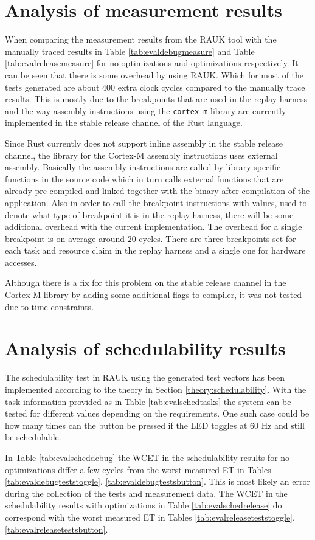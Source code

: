 \section{Analysis of measurement results}
When comparing the measurement results from the RAUK tool with the manually
traced results in Table \ref{tab:evaldebugmeasure} and Table
\ref{tab:evalreleasemeasure} for no optimizations and optimizations
respectively. It can be seen that there is some overhead by using RAUK. Which
for most of the tests generated are about 400 extra clock cycles compared to
the manually trace results. This is mostly due to the breakpoints that are used
in the replay harness and the way assembly instructions using the
\texttt{cortex-m} library are currently implemented in the stable release
channel of the Rust language.

Since Rust currently does not support inline assembly in the stable release
channel, the library for the Cortex-M assembly instructions uses external
assembly. Basically the assembly instructions are called by library specific
functions in the source code which in turn calls external functions that are
already pre-compiled and linked together with the binary after compilation of
the application. Also in order to call the breakpoint instructions with values,
used to denote what type of breakpoint it is in the replay harness, there will
be some additional overhead with the current implementation. The overhead for a
single breakpoint is on average around 20 cycles. There are three breakpoints
set for each task and resource claim in the replay harness and a single one for
hardware accesses.

Although there is a fix for this problem on the stable release channel in the
Cortex-M library by adding some additional flags to compiler, it was not
tested due to time constraints.

\section{Analysis of schedulability results}
The schedulability test in RAUK using the generated test vectors has been
implemented according to the theory in Section \ref{theory:schedulability}.
With the task information provided as in Table \ref{tab:evalschedtasks} the
system can be tested for different values depending on the requirements. One
such case could be how many times can the button be pressed if the LED toggles
at 60 Hz and still be schedulable.

In Table \ref{tab:evalscheddebug} the WCET in the schedulability results for no
optimizations differ a few cycles from the worst measured ET in Tables
\ref{tab:evaldebugteststoggle}, \ref{tab:evaldebugtestsbutton}. This is most
likely an error during the collection of the tests and measurement data. The
WCET in the schedulability results with optimizations in Table
\ref{tab:evalschedrelease} do correspond with the worst measured ET in Tables
\ref{tab:evalreleaseteststoggle}, \ref{tab:evalreleasetestsbutton}.

